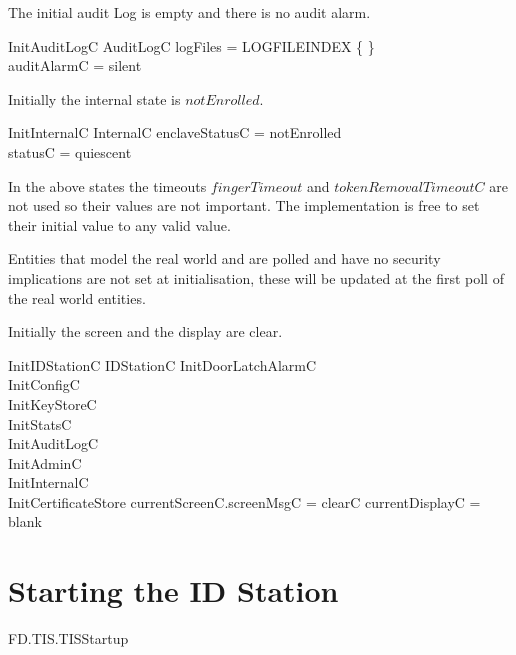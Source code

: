 The initial audit Log is empty and there is no audit alarm.

\begin{schema}{InitAuditLogC}
        AuditLogC
\where
        logFiles = LOGFILEINDEX \cross \{ \emptyset \}
\\      auditAlarmC = silent
\end{schema}        

Initially the internal state
is $notEnrolled$.

\begin{schema}{InitInternalC}
        InternalC
\where
	enclaveStatusC = notEnrolled
\\      statusC = quiescent
\end{schema}
\begin{Zcomment}
\item
In the above states the timeouts $fingerTimeout$ and
$tokenRemovalTimeoutC$ are not used so their values are not
important. The implementation is free to set their initial value to
any valid value. 
\end{Zcomment}

Entities that model the real world and are polled and have no security
implications are not set 
at initialisation, these will be updated at the first poll of the real
world entities.

Initially the screen and the display are clear. 

\begin{schema}{InitIDStationC}
        IDStationC
\also
	InitDoorLatchAlarmC
\\	InitConfigC
\\      InitKeyStoreC
\\      InitStatsC
\\      InitAuditLogC
\\      InitAdminC
\\      InitInternalC
\\      InitCertificateStore
\where
        currentScreenC.screenMsgC = clearC
\also
	currentDisplayC = blank
\end{schema}

\section{Starting the ID Station}
\begin{traceunit}{FD.TIS.TISStartup}
\end{traceunit}



